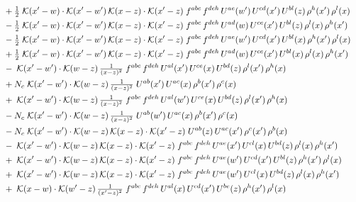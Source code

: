 \documentclass[10pt]{article}
\numberwithin{equation}{section}
\begin{document}
\begin{align}
&\quad +\tfrac{1}{2}\;\mathcal{K}(x'-w)\cdot\mathcal{K}(x'-w')\,\mathcal{K}(x-z)\cdot\mathcal{K}(x'-z)\;f^{abc}\,f^{deh}\,U^{ae}(w')\,U^{cd}(x')\,U^{bl}(z)\,\rho^{h}(x')\,\rho^{l}(x)\notag\\
&\quad -\tfrac{1}{2}\;\mathcal{K}(x'-w)\cdot\mathcal{K}(x'-w')\,\mathcal{K}(x-z)\cdot\mathcal{K}(x'-z)\;f^{abc}\,f^{deh}\,U^{ad}(w)\,U^{ce}(x')\,U^{bl}(z)\,\rho^{l}(x)\,\rho^{h}(x')\notag\\
&\quad -\tfrac{1}{2}\;\mathcal{K}(x'-w)\cdot\mathcal{K}(x'-w')\,\mathcal{K}(x-z)\cdot\mathcal{K}(x'-z)\;f^{abc}\,f^{deh}\,U^{ae}(w')\,U^{cd}(x')\,U^{bl}(x)\,\rho^{h}(x')\,\rho^{l}(x)\notag\\
&\quad +\tfrac{1}{2}\;\mathcal{K}(x'-w)\cdot\mathcal{K}(x'-w')\,\mathcal{K}(x-z)\cdot\mathcal{K}(x'-z)\;f^{abc}\,f^{deh}\,U^{ad}(w)\,U^{ce}(x')\,U^{bl}(x)\,\rho^{l}(x)\,\rho^{h}(x')\notag\\
&\quad -\;\mathcal{K}(x'-w')\cdot\mathcal{K}(w-z)\,\tfrac{1}{(x-z)^{2}}\;f^{abc}\,f^{deh}\,U^{al}(x')\,U^{ce}(x)\,U^{bd}(z)\,\rho^{l}(x')\,\rho^{h}(x)\notag\\
&\quad +N_c\;\mathcal{K}(x'-w')\cdot\mathcal{K}(w-z)\,\tfrac{1}{(x-z)^{2}}\;U^{ab}(x')\,U^{ac}(x)\,\rho^{b}(x')\,\rho^{c}(x)\notag\\
&\quad +\;\mathcal{K}(x'-w')\cdot\mathcal{K}(w-z)\,\tfrac{1}{(x-z)^{2}}\;f^{abc}\,f^{deh}\,U^{al}(w')\,U^{ce}(x)\,U^{bd}(z)\,\rho^{l}(x')\,\rho^{h}(x)\notag\\
&\quad -N_c\;\mathcal{K}(x'-w')\cdot\mathcal{K}(w-z)\,\tfrac{1}{(x-z)^{2}}\;U^{ab}(w')\,U^{ac}(x)\,\rho^{b}(x')\,\rho^{c}(x)\notag\\
&\quad -N_c\;\mathcal{K}(x'-w')\cdot\mathcal{K}(w-z)\,\mathcal{K}(x-z)\cdot\mathcal{K}(x'-z)\;U^{ab}(z)\,U^{ac}(x')\,\rho^{c}(x')\,\rho^{b}(x)\notag\\
&\quad -\;\mathcal{K}(x'-w')\cdot\mathcal{K}(w-z)\,\mathcal{K}(x-z)\cdot\mathcal{K}(x'-z)\;f^{abc}\,f^{deh}\,U^{ae}(x')\,U^{cl}(x)\,U^{bd}(z)\,\rho^{l}(x)\,\rho^{h}(x')\notag\\
&\quad +\;\mathcal{K}(x'-w')\cdot\mathcal{K}(w-z)\,\mathcal{K}(x-z)\cdot\mathcal{K}(x'-z)\;f^{abc}\,f^{deh}\,U^{ae}(w')\,U^{cd}(x')\,U^{bl}(z)\,\rho^{h}(x')\,\rho^{l}(x)\notag\\
&\quad +\;\mathcal{K}(x'-w')\cdot\mathcal{K}(w-z)\,\mathcal{K}(x-z)\cdot\mathcal{K}(x'-z)\;f^{abc}\,f^{deh}\,U^{ae}(w')\,U^{cl}(x)\,U^{bd}(z)\,\rho^{l}(x)\,\rho^{h}(x')\notag\\
&\quad +\;\mathcal{K}(x-w)\cdot\mathcal{K}(w'-z)\,\tfrac{1}{(x'-z)^{2}}\;f^{abc}\,f^{deh}\,U^{al}(x)\,U^{cd}(x')\,U^{be}(z)\,\rho^{h}(x')\,\rho^{l}(x)\notag\\

\end{align}
\end{document}
